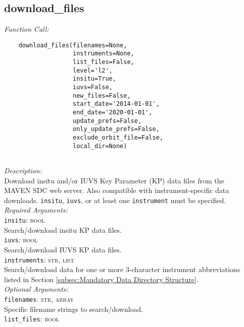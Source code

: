 \documentclass{article}
\begin{document}
\subsection{download\_files}
\label{subsec:downloadfiles}
\vspace{-5mm}
\textit{Function Call:}\\
\vspace{-10mm}
\begin{verbatim}
    download_files(filenames=None,
                   instruments=None, 
                   list_files=False,
                   level='l2', 
                   insitu=True, 
                   iuvs=False, 
                   new_files=False, 
                   start_date='2014-01-01', 
                   end_date='2020-01-01', 
                   update_prefs=False,
                   only_update_prefs=False, 
                   exclude_orbit_file=False,
                   local_dir=None)
    
\end{verbatim}
\vspace{-5mm}
\noindent
\textit{Description:}\\
\indent Download insitu and/or IUVS Key Parameter (KP) data files from the\\
\indent MAVEN SDC web server. Also compatible with instrument-specific data\\
\indent downloads. \texttt{insitu}, \texttt{iuvs}, or at least one \texttt{instrument} must be specified.\\
\textit{Required Arguments:}\\
\indent \texttt{insitu}: \textsc{bool}\\
\indent \indent Search/download insitu KP data files.\\
\indent \texttt{iuvs}: \textsc{bool}\\
\indent \indent Search/download IUVS KP data files.\\
\indent \texttt{instruments}: \textsc{str, list}\\
\indent \indent Search/download data for one or more 3-character instrument abbreviations\\
\indent \indent listed in Section \ref{subsec:Mandatory Data Directory Structure}.\\
\textit{Optional Arguments:}\\
\indent \texttt{filenames}: \textsc{str, array}\\
\indent \indent Specific filename strings to search/download.\\
\indent \texttt{list\_files}: \textsc{bool}\\
\end{document}
